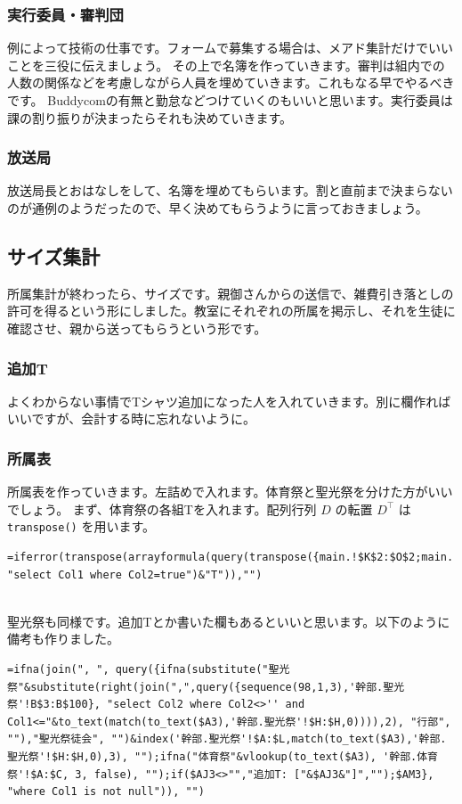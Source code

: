 \documentclass[dvipdfmx,jb5]{jreport}
\begin{document}
\subsubsection{実行委員・審判団}
例によって技術の仕事です。フォームで募集する場合は、メアド集計だけでいいことを三役に伝えましょう。
その上で名簿を作っていきます。審判は組内での人数の関係などを考慮しながら人員を埋めていきます。これもなる早でやるべきです。
Buddycomの有無と勤怠などつけていくのもいいと思います。実行委員は課の割り振りが決まったらそれも決めていきます。

\subsubsection{放送局}
放送局長とおはなしをして、名簿を埋めてもらいます。割と直前まで決まらないのが通例のようだったので、早く決めてもらうように言っておきましょう。

\subsection{サイズ集計}
所属集計が終わったら、サイズです。親御さんからの送信で、雑費引き落としの許可を得るという形にしました。教室にそれぞれの所属を掲示し、それを生徒に確認させ、親から送ってもらうという形です。

\subsubsection{追加T}
よくわからない事情でTシャツ追加になった人を入れていきます。別に欄作ればいいですが、会計する時に忘れないように。

\subsubsection{所属表}
所属表を作っていきます。左詰めで入れます。体育祭と聖光祭を分けた方がいいでしょう。
まず、体育祭の各組Tを入れます。配列行列 $D$ の転置 $D^\top$ は \texttt{transpose()} を用います。
\\
\begin{lstlisting}
=iferror(transpose(arrayformula(query(transpose({main.!$K$2:$O$2;main.!$K3:$O3}), "select Col1 where Col2=true")&"T")),"")
\end{lstlisting}
\\
聖光祭も同様です。追加Tとか書いた欄もあるといいと思います。以下のように備考も作りました。
\\
\begin{lstlisting}
=ifna(join(", ", query({ifna(substitute("聖光祭"&substitute(right(join(",",query({sequence(98,1,3),'幹部.聖光祭'!B$3:B$100}, "select Col2 where Col2<>'' and Col1<="&to_text(match(to_text($A3),'幹部.聖光祭'!$H:$H,0)))),2), "行部", ""),"聖光祭徒会", "")&index('幹部.聖光祭'!$A:$L,match(to_text($A3),'幹部.聖光祭'!$H:$H,0),3), "");ifna("体育祭"&vlookup(to_text($A3), '幹部.体育祭'!$A:$C, 3, false), "");if($AJ3<>"","追加T: ["&$AJ3&"]","");$AM3}, "where Col1 is not null")), "")
\end{lstlisting}
\end{document}

